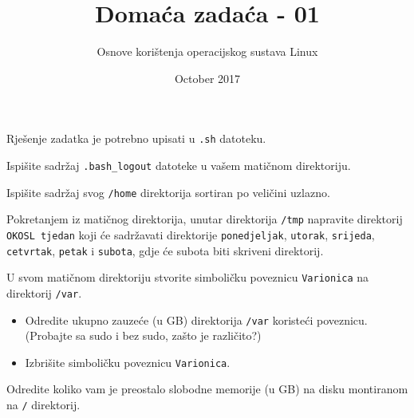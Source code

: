 \documentclass{exam}
\author{Osnove korištenja operacijskog sustava Linux}
\date{October 2017}
\newcommand{\shell}[1]{\texttt{#1}}
\begin{document}
\title{Domaća zadaća - 01}
\maketitle
Rješenje zadatka je potrebno upisati u \shell{.sh} datoteku.


\begin{questions}
\question Ispišite sadržaj \shell{.bash\_logout} datoteke u vašem matičnom direktoriju.

\question Ispišite sadržaj svog \shell{/home} direktorija sortiran po veličini uzlazno.

\question Pokretanjem iz matičnog direktorija, unutar direktorija \shell{/tmp} napravite direktorij \shell{OKOSL tjedan} koji će sadržavati direktorije \shell{ponedjeljak}, \shell{utorak}, \shell{srijeda}, \shell{cetvrtak}, \shell{petak} i \shell{subota}, gdje će subota biti skriveni direktorij.


\question U svom matičnom direktoriju stvorite simboličku poveznicu \shell{Varionica} na direktorij \shell{/var}. 
\begin{itemize}
    \item Odredite ukupno zauzeće (u GB) direktorija \shell{/var} koristeći poveznicu. (Probajte sa sudo i bez sudo, zašto je različito?)
    \item Izbrišite simboličku poveznicu \shell{Varionica}.
\end{itemize}

\question Odredite koliko vam je preostalo slobodne memorije (u GB) na disku montiranom na \shell{/} direktorij.




\end{questions}
\end{document}
